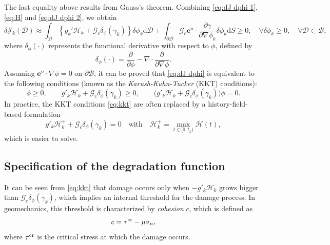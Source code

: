\documentclass{article}
\begin{document}
The last equality above results from Gauss's theorem. Combining \eqref{eq:dJ dphi 1}, \eqref{eq:H} and \eqref{eq:dJ dphi 2}, we obtain
\begin{equation}\label{eq:dJ dphi}
  \delta\mathcal J_k(\mathcal D)\approx\int_{\mathcal D}\left\{g_k'\mathcal H_k + \mathcal G_c\delta_\phi(\gamma_k)\right\}\delta\phi_k\mathrm d\mathcal D 
  + \int_{\partial\mathcal D}\mathcal G_c\bm e^n\cdot\frac{\partial\gamma}{\partial\nabla\phi_k}\delta\phi_k\mathrm dS\geq 0,\quad\forall\delta\phi_k\geq 0,\quad\forall\mathcal D\subset\mathcal B,
\end{equation}
where $\delta_\phi(\cdot)$ represents the functional derivative with respect to $\phi$, defined by
\begin{equation}
  \delta_\phi(\cdot) = \frac{\partial}{\partial\phi} - \nabla\cdot\frac{\partial}{\partial\nabla\phi}.
\end{equation}
Assuming $\bm e^n\cdot\nabla\phi = 0$ on $\partial\mathcal B$, it can be proved that \eqref{eq:dJ dphi} is equivalent to the following conditions (known as the \textit{Karush-Kuhn-Tucker} (KKT) conditions):
\begin{equation}\label{eq:kkt}
  \dot\phi\geq 0,\qquad
  g'_k\mathcal H_k + \mathcal G_c\delta_\phi(\gamma_k)\geq 0,\qquad
  \big(g'_k\mathcal H_k + \mathcal G_c\delta_\phi(\gamma_k)\big)\dot\phi = 0.
\end{equation}
In practice, the KKT conditions \eqref{eq:kkt} are often replaced by a history-field-based formulation
\begin{equation}\label{eq:H+}
  g'_k\mathcal H_k^+ + \mathcal G_c\delta_\phi(\gamma_k) = 0\quad\text{with}\quad\mathcal H_k^+ = \max_{t\in[0,t_k)}\mathcal H(t),
\end{equation}
which is easier to solve.


\subsection{Specification of the degradation function}

It can be seen from \eqref{eq:kkt} that damage occurs only when $-g'_k\mathcal H_k$ grows bigger than $\mathcal G_c\delta_\phi(\gamma_k)$, which implies an internal threshold for the damage process. In geomechanics, this threshold is characterized by \textit{cohesion} $c$, which is defined as
\begin{equation}
  c = \tau^{\rm cr} - \mu\sigma_n,
\end{equation}
where $\tau^{\rm cr}$ is the critical stress at which the damage occurs.
\end{document}
